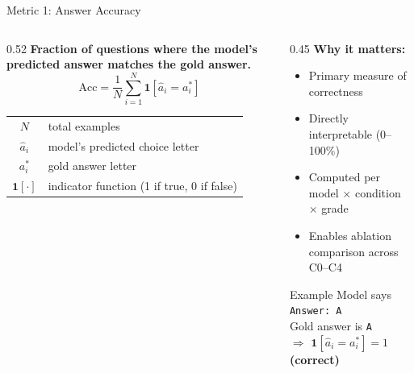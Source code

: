 \documentclass[aspectratio=169]{beamer}
\begin{document}
\begin{frame}{Metric 1: Answer Accuracy}
\begin{columns}[T]
  \begin{column}{0.52\textwidth}
      \textbf{Fraction of questions where the model's predicted answer
      matches the gold answer.}
    \vspace{0.3cm}
    \large
    \[
      \text{Acc} = \frac{1}{N}\sum_{i=1}^{N}\mathbf{1}\!\left[\hat{a}_i = a_i^*\right]
    \]
    \normalsize
    \vspace{0.3cm}
    \begin{tabular}{cl}
      $N$ & total examples\\
      $\hat{a}_i$ & model's predicted choice letter\\
      $a_i^*$ & gold answer letter\\
      $\mathbf{1}[\cdot]$ & indicator function (1 if true, 0 if false)
    \end{tabular}
  \end{column}
  \begin{column}{0.45\textwidth}
    \textbf{Why it matters:}
    \begin{itemize}\itemsep5pt
      \item Primary measure of correctness
      \item Directly interpretable (0--100\%)
      \item Computed per model $\times$ condition $\times$ grade
      \item Enables ablation comparison across C0--C4
    \end{itemize}
    \vspace{0.3cm}
    \begin{alertblock}{Example}
      \small
      Model says \texttt{Answer: A}\\
      Gold answer is \texttt{A}\\
      $\Rightarrow$ $\mathbf{1}[\hat{a}_i = a_i^*] = 1$ \textbf{(correct)}
    \end{alertblock}
  \end{column}
\end{columns}
\end{frame}
\end{document}
